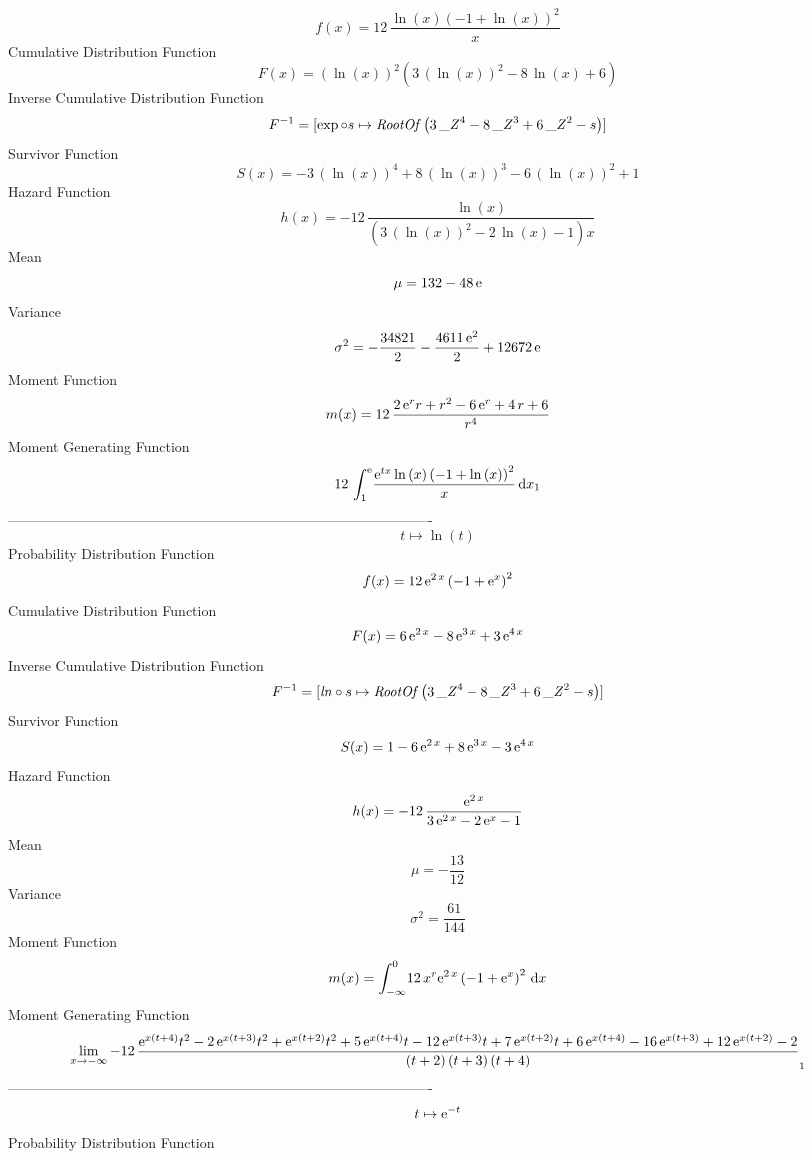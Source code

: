 \documentclass[12pt]{article}
\begin{document}
$$  f(x)=12\,{\frac {\ln  \left( x \right)  \left( -1+\ln  \left( x \right) 
 \right) ^{2}}{x}}
$$Cumulative Distribution Function  
 $$F(x)= \left( \ln  \left( x \right)  \right) ^{2} \left( 3\, \left( \ln 
 \left( x \right)  \right) ^{2}-8\,\ln  \left( x \right) +6 \right) 
$$ Inverse Cumulative Distribution Function 
  $$F^{-1} = [\exp\circ s\mapsto {\it RootOf} \left( 3\,{{\it \_Z}}^{4}-8\,{{\it 
\_Z}}^{3}+6\,{{\it \_Z}}^{2}-s \right) ]
$$Survivor Function 
 $$ S(x)=-3\, \left( \ln  \left( x \right)  \right) ^{4}+8\, \left( \ln 
 \left( x \right)  \right) ^{3}-6\, \left( \ln  \left( x \right) 
 \right) ^{2}+1
$$ Hazard Function 
 $$ h(x)=-12\,{\frac {\ln  \left( x \right) }{ \left( 3\, \left( \ln  \left( x
 \right)  \right) ^{2}-2\,\ln  \left( x \right) -1 \right) x}}
$$Mean 
 $$ \mu=132-48\,{\rm e}
$$ Variance 
 $$ \sigma^2 = -{\frac{34821}{2}}-{\frac {4611\,{{\rm e}^{2}}}{2}}+12672\,{\rm e}
$$Moment Function 
 $$ m(x) = 12\,{\frac {2\,{{\rm e}^{r}}r+{r}^{2}-6\,{{\rm e}^{r}}+4\,r+6}{{r}^{4}
}}
$$ Moment Generating Function 
 $$12\,\int_{1}^{{\rm e}}\!{\frac {{{\rm e}^{tx}}\ln  \left( x \right) 
 \left( -1+\ln  \left( x \right)  \right) ^{2}}{x}}\,{\rm d}x_{{1}}
$$-------------------------------------------------------------------------------------------  \\$$t\mapsto \ln  \left( t \right) 
$$Probability Distribution Function 
$$  f(x)=12\,{{\rm e}^{2\,x}} \left( -1+{{\rm e}^{x}} \right) ^{2}
$$Cumulative Distribution Function  
 $$F(x)=6\,{{\rm e}^{2\,x}}-8\,{{\rm e}^{3\,x}}+3\,{{\rm e}^{4\,x}}
$$ Inverse Cumulative Distribution Function 
  $$F^{-1} = [{\it ln}\circ s\mapsto {\it RootOf} \left( 3\,{{\it \_Z}}^{4}-8\,{{
\it \_Z}}^{3}+6\,{{\it \_Z}}^{2}-s \right) ]
$$Survivor Function 
 $$ S(x)=1-6\,{{\rm e}^{2\,x}}+8\,{{\rm e}^{3\,x}}-3\,{{\rm e}^{4\,x}}
$$ Hazard Function 
 $$ h(x)=-12\,{\frac {{{\rm e}^{2\,x}}}{3\,{{\rm e}^{2\,x}}-2\,{{\rm e}^{x}}-1}
}
$$Mean 
 $$ \mu=-{\frac{13}{12}}
$$ Variance 
 $$ \sigma^2 = {\frac{61}{144}}
$$Moment Function 
 $$ m(x) = \int_{-\infty }^{0}\!12\,{x}^{r}{{\rm e}^{2\,x}} \left( -1+{{\rm e}^{x
}} \right) ^{2}\,{\rm d}x
$$ Moment Generating Function 
 $$\lim _{x\rightarrow -\infty }-12\,{\frac {{{\rm e}^{x \left( t+4
 \right) }}{t}^{2}-2\,{{\rm e}^{x \left( t+3 \right) }}{t}^{2}+{
{\rm e}^{x \left( t+2 \right) }}{t}^{2}+5\,{{\rm e}^{x \left( t+4
 \right) }}t-12\,{{\rm e}^{x \left( t+3 \right) }}t+7\,{{\rm e}^{x
 \left( t+2 \right) }}t+6\,{{\rm e}^{x \left( t+4 \right) }}-16\,{
{\rm e}^{x \left( t+3 \right) }}+12\,{{\rm e}^{x \left( t+2 \right) }}
-2}{ \left( t+2 \right)  \left( t+3 \right)  \left( t+4 \right) }}_{{1
}}
$$-------------------------------------------------------------------------------------------  \\$$t\mapsto {{\rm e}^{-t}}
$$Probability Distribution Function 
\end{document}
